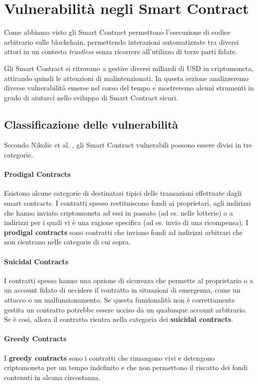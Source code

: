 \section{Vulnerabilità negli Smart Contract}

Come abbiamo visto gli Smart Contract permettono l'esecuzione di codice arbitrario
sulle blockchain, permettendo interazioni automatizzate tra diversi attori in un contesto
\textit{trustless} senza ricorrere all'utilizzo di terze parti fidate.

Gli Smart Contract si ritrovano a gestire diversi miliardi di USD in criptomoneta,
attirando quindi le attenzioni di malintenzionati. In questa sezione analizzeremo
diverse vulnerabilità emerse nel corso del tempo e mostreremo
alcuni strumenti in grado di aiutarci nello sviluppo di Smart Contract sicuri.

\subsection{Classificazione delle vulnerabilità}
Secondo Nikolic et al. \cite{Nikolic2018FindingTG},
gli Smart Contract vulnerabili possono essere divisi in tre categorie.

\paragraph{Prodigal Contracts}
Esistono alcune categorie di destinatari tipici delle transazioni effettuate
dagli smart contracts. I contratti spesso restituiscono fondi ai
proprietari, agli indirizzi che hanno inviato
criptomoneta ad essi in passato (ad es. nelle lotterie) o a indirizzi
per i quali vi è una ragione specifica (ad es. invio di una ricompensa).
I \textbf{prodigal contracts} sono contratti che inviano fondi ad
indirizzi arbitrari che non rientrano nelle categorie di cui sopra.

\paragraph{Suicidal Contracts}
I contratti spesso hanno una opzione di sicurezza che permette al proprietario
o a un account fidato di uccidere il contratto in situazioni di emergenza,
come un attacco o un malfunzionamento. Se questa funzionalità non è correttamente gestita
un contratto potrebbe essere ucciso da un qualunque account arbitrario.
Se è così, allora il contratto rientra nella categoria dei \textbf{suicidal contracts}.

\paragraph{Greedy Contracts}
I \textbf{greedy contracts} sono i contratti che rimangono vivi e detengono
criptomoneta per un tempo indefinito e che non permettono il riscatto dei
fondi contenuti in alcuna circostanza.

